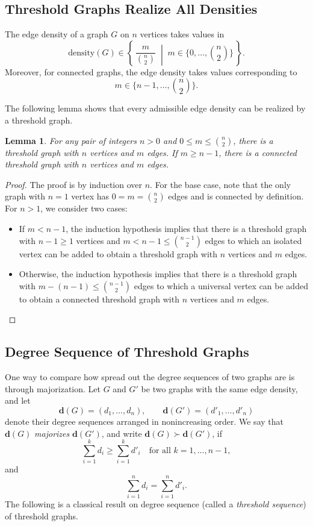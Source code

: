 \documentclass[11pt,reqno]{amsart}
\newtheorem{lemma}[theorem]{Lemma}
\theoremstyle{definition}
\begin{document}
\subsection{Threshold Graphs Realize All Densities}\label{discuss}
The edge density of a graph $G$ on $n$ vertices takes values in
\begin{equation}\label{all}
\mathrm{density}(G)\in
\left\{\, \frac{m}{\binom{n}{2}} \;\middle|\; m \in \{0,\ldots,\binom{n}{2}\} \,\right\}.
\end{equation}
Moreover, for connected graphs, the edge density takes values corresponding to
\[
m \in \{n-1,\ldots,\binom{n}{2}\}.
\]

The following lemma shows that every admissible edge density can be realized by a
threshold graph.

\begin{lemma}
For any pair of integers $n>0$ and $0 \le m \le \binom{n}{2}$, there is a threshold
graph with $n$ vertices and $m$ edges. If $m \ge n-1$, there is a connected threshold
graph with $n$ vertices and $m$ edges.
\end{lemma}

\begin{proof}
The proof is by induction over $n$. For the base case, note that the only
graph with $n=1$ vertex has $0=m=\binom{n}{2}$ edges and is connected by definition.
For $n>1$, we consider two cases:
\begin{itemize}
\item
If $m<n-1$, the induction hypothesis implies that there is a threshold
graph with $n-1\ge 1$ vertices and $m<n-1\le \binom{n-1}{2}$ edges to which an
isolated vertex can be added to obtain a threshold graph with $n$ vertices
and $m$ edges.
\item
Otherwise, the induction hypothesis implies that there is a threshold graph
with $m-(n-1)\le \binom{n-1}{2}$ edges to which a universal vertex can be added
to obtain a connected threshold graph with $n$ vertices and $m$ edges.
\end{itemize}
\end{proof}

\subsection{Degree Sequence of Threshold Graphs}
One way to compare how spread out the degree sequences of two graphs are is through majorization.
Let $G$ and $G'$ be two graphs with the same edge density, and let
\[
\mathbf d(G) = (d_1,\dots,d_n), \qquad 
\mathbf d(G') = (d'_1,\dots,d'_n)
\]
denote their degree sequences arranged in nonincreasing order.
We say that $\mathbf d(G)$ \emph{majorizes} $\mathbf d(G')$, and write $\mathbf d(G) \succ \mathbf d(G')$, if
\[ \sum_{i=1}^k d_i \ge \sum_{i=1}^k d'_i \quad \text{for all } k=1,\dots,n-1, \]
and
\[ \sum_{i=1}^n d_i = \sum_{i=1}^n d'_i. \]
The following is a classical result on degree sequence (called a \emph{threshold sequence}) of threshold graphs.
\end{document}
